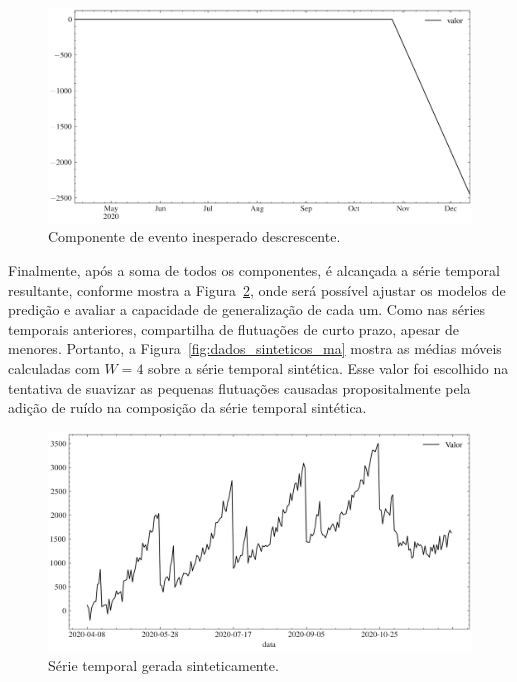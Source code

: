 \begin{figure}[!htp]
    \centering
    \includegraphics[width=5.0in]{img/big_event.pdf}
    \caption{Componente de evento inesperado descrescente.}
    \label{fig:big_event}
\end{figure}

Finalmente, após a soma de todos os componentes, é alcançada a série temporal resultante, conforme mostra a Figura~\ref{fig:dados_sinteticos}, onde será possível ajustar os modelos de predição e avaliar a capacidade de generalização de cada um. Como nas séries temporais anteriores, compartilha de flutuações de curto prazo, apesar de menores. Portanto, a Figura~\ref{fig:dados_sinteticos_ma} mostra as médias móveis calculadas com $W=4$ sobre a série temporal sintética. Esse valor foi escolhido na tentativa de suavizar as pequenas flutuações causadas propositalmente pela adição de ruído na composição da série temporal sintética.

\begin{figure}[!htp]
    \centering
    \includegraphics[width=5.0in]{img/dados_sinteticos.pdf}
    \caption{Série temporal gerada sinteticamente.}
    \label{fig:dados_sinteticos}
\end{figure}


